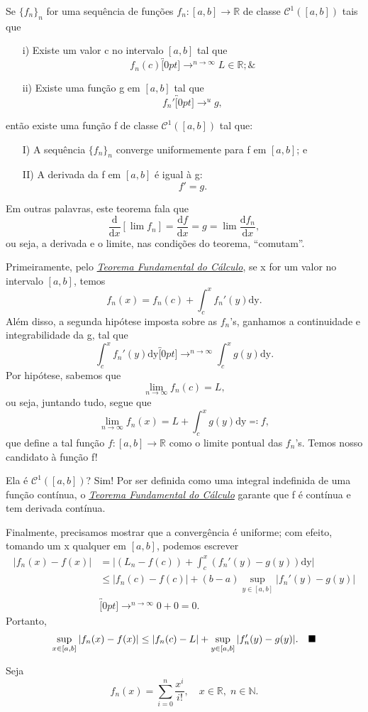 \documentclass[../analysisII_notes.tex]{subfiles}
\begin{document}
\begin{theorem*}
	Se \(\{f_{n}\}_{n}\) for uma sequência de funções \(f_{n}:[a, b]\rightarrow \mathbb{R}\) de classe \(\mathcal{C}^{1}([a, b])\) tais que
	\begin{itemize}
		\item[i)] Existe um valor c no intervalo \([a, b]\) tal que
		      \[
			      f_{n}(c)\overbracket[0pt]{\longrightarrow}^{n\to \infty}L\in \mathbb{R};\&
		      \]
		\item[ii)] Existe uma função g em \([a, b]\) tal que
		      \[
			      f_{n}'\overbracket[0pt]{\longrightarrow}^{u}g,
		      \]
	\end{itemize}
	então existe uma função f de classe \(\mathcal{C}^{1}([a, b])\) tal que:
	\begin{itemize}
		\item[I)] A sequência \(\{f_{n}\}_{n}\) converge uniformemente para f em \([a, b]\); e
		\item[II)] A derivada da f em \([a, b]\) é igual à g:
		      \[
			      f'=g.
		      \]
	\end{itemize}
\end{theorem*}
Em outras palavras, este teorema fala que
\[
	\frac{\mathrm{d}}{\mathrm{d}x}[\lim_{}f_{n}] = \frac{\mathrm{d}f}{\mathrm{d}x} = g = \lim_{}\frac{\mathrm{d}f_{n}}{\mathrm{d}x},
\]
ou seja, a derivada e o limite, nas condições do teorema, ``comutam''.
\begin{proof*}
	Primeiramente, pelo \hyperlink{ftc}{\textit{Teorema Fundamental do Cálculo}}, se x for um valor no intervalo \([a, b]\), temos
	\[
		f_{n}(x) = f_{n}(c) + \int_{c}^{x}f_{n}'(y) \mathrm{dy}.
	\]
	Além disso, a segunda hipótese imposta sobre as \(f_{n}\)'s, ganhamos a continuidade e integrabilidade da g, tal que
	\[
		\int_{c}^{x}f_{n}'(y) \mathrm{dy}\overbracket[0pt]{\longrightarrow}^{n\to \infty}\int_{c}^{x}g(y) \mathrm{dy}.
	\]
	Por hipótese, sabemos que
	\[
		\lim_{n\to \infty}f_{n}(c) = L,
	\]
	ou seja, juntando tudo, segue que
	\[
		\lim_{n\to \infty}f_{n}(x) = L + \int_{c}^{x}g(y) \mathrm{dy} \eqqcolon f,
	\]
	que define a tal função \(f:[a, b]\rightarrow \mathbb{R}\) como o limite pontual das \(f_{n}\)'s. Temos nosso candidato à função f!

	Ela é \(\mathcal{C}^{1}([a, b])\)? Sim! Por ser definida como uma integral indefinida de uma função contínua, o \hyperlink{ftc}{\textit{Teorema Fundamental do Cálculo}} garante que f é contínua e tem derivada contínua.

	Finalmente, precisamos mostrar que a convergência é uniforme; com efeito, tomando um x qualquer em \([a, b]\), podemos escrever
	\begin{align*}
		|f_{n}(x)-f(x)| & = \biggl\vert (L_{n} - f(c)) + \int_{c}^{x}(f_{n}'(y)-g(y)) \mathrm{dy} \biggr\vert \\
		                & \leq |f_{n}(c)-f(c)| + (b-a)\sup_{y\in[a, b]}|f_{n}'(y) - g(y)|                     \\
		                & \overbracket[0pt]{\longrightarrow}^{n\to \infty}0 + 0 = 0.
	\end{align*}
	Portanto,
	\[
		\sup_{x\in [a, b]}|f_{n}(x)-f(x)|\leq |f_{n}(c)-L|+\sup_{y\in [a, b]}|f_{n}'(y)-g(y)|.\quad \text{$\blacksquare$}
	\]
\end{proof*}
\begin{example}
	Seja
	\[
		f_{n}(x) = \sum\limits_{i=0}^{n}\frac{x^{i}}{i!},\quad x\in \mathbb{R},\; n\in \mathbb{N}.
	\]
\end{example}
\end{document}
